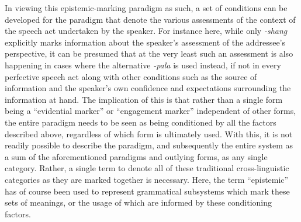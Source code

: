 In viewing this epistemic-marking paradigm as such, a set of conditions can be developed for the paradigm that denote the various assessments of the context of the speech act undertaken by the speaker. For instance here, while only \textit{-shang} explicitly marks information about the speaker's assessment of the addressee's perspective, it can be presumed that at the very least such an assessment is also happening in cases where the alternative \textit{-pala} is used instead, if not in every perfective speech act along with other conditions such as the source of information and the speaker's own confidence and expectations surrounding the information at hand. The implication of this is that rather than a single form being a ``evidential marker'' or ``engagement marker'' independent of other forms, the entire paradigm needs to be seen as being conditioned by all the factors described above, regardless of which form is ultimately used. With this, it is not readily possible to describe the paradigm, and subsequently the entire system as a sum of the aforementioned paradigms and outlying forms, as any single category. Rather, a single term to denote all of these traditional cross-linguistic categories as they are marked together is necessary. Here, the term ``epistemic'' has of course been used to represent grammatical subsystems which mark these sets of meanings, or the usage of which are informed by these conditioning factors.




